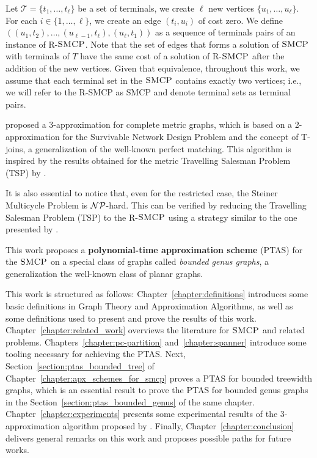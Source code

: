 Let \(\mathcal{T} = \{t_1, \dots, t_\ell\}\) be a set of terminals, we create \(\ell\) new vertices \(\{u_1, \dots, u_\ell\}\). For each \(i \in \{1, \ldots, \ell\}\), we create an edge \((t_i, u_i)\) of cost zero. We define \(((u_1, t_2), \dots, (u_{\ell-1}, t_\ell), (u_\ell, t_1))\) as a sequence of terminals pairs of an instance of R-\(\textsc{SMCP}\). Note that the set of edges that forms a solution of \(\textsc{SMCP}\) with terminals of \(T\) have the same cost of a solution of R-\(\textsc{SMCP}\) after the addition of the new vertices. Given that equivalence, throughout this work, we assume that each terminal set in the \(\textsc{SMCP}\) contains exactly two vertices; i.e., we will refer to the R-SMCP as SMCP and denote terminal sets as terminal pairs.

\cite{smcp_3apx} proposed a 3-approximation for complete metric graphs, which is based on a 2-approximation for the Survivable Network Design Problem and the concept of T-joins, a generalization of the well-known perfect matching. This algorithm is inspired by the results obtained for the metric Travelling Salesman Problem (TSP) by \cite{Christofides2022WorstCaseAO}.

It is also essential to notice that, even for the restricted case, the Steiner Multicycle Problem is \(\mathcal{NP}\)-hard. This can be verified by reducing the Travelling Salesman Problem (TSP) to the R-\(\textsc{SMCP}\) using a strategy similar to the one presented by \citeauthor{LINTZMAYER2020134}.

This work proposes a \textbf{polynomial-time approximation scheme} (PTAS) for the \(\textsc{SMCP}\) on a special class of graphs called \textit{bounded genus graphs}, a generalization the well-known class of planar graphs.

This work is structured as follows: Chapter~\ref{chapter:definitions} introduces some basic definitions in Graph Theory and Approximation Algorithms, as well as some definitions used to present and prove the results of this work. Chapter~\ref{chapter:related_work} overviews the literature for \(\textsc{SMCP}\) and related problems. Chapters~\ref{chapter:pc-partition} and~\ref{chapter:spanner} introduce some tooling necessary for achieving the PTAS. Next, Section~\ref{section:ptas_bounded_tree} of Chapter~\ref{chapter:apx_schemes_for_smcp} proves a PTAS for bounded treewidth graphs, which is an essential result to prove the PTAS for bounded genus graphs in the Section~\ref{section:ptas_bounded_genus} of the same chapter. Chapter~\ref{chapter:experiments} presents some experimental results of the 3-approximation algorithm proposed by \cite{smcp_3apx}. Finally, Chapter~\ref{chapter:conclusion} delivers general remarks on this work and proposes possible paths for future works.

